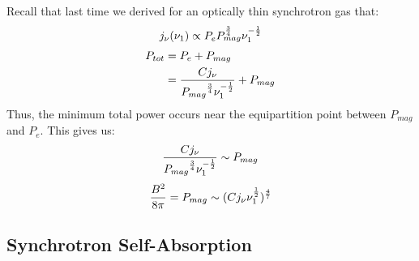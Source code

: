 \documentclass[11pt]{article}
\def\hf{{1 \over 2}}
\begin{document}
Recall that last time we derived for an optically thin synchrotron gas that:
\def\pmag{{P_{mag}}}
$$j_\nu(\nu_1)\propto P_eP_{mag}^{3\over4}\nu_1^{-\hf}$$
$$\begin{aligned}P_{tot}&=P_e+P_{mag}\\ 
&={Cj_\nu\over\pmag^{3\over4}\nu_1^{-\hf}}+\pmag\\ \end{aligned}$$
Thus, the minimum total power occurs near the equipartition point between
$\pmag$ and $P_e$.  This gives us:
\def\jn{j_\nu}
$${C\jn\over\pmag^{3\over4}\nu_1^{-\hf}}\sim\pmag$$
$${B^2\over8\pi}=\pmag\sim(C\jn\nu_1^\hf)^{4\over7}$$

\subsection*{ Synchrotron Self-Absorption}
\end{document}
